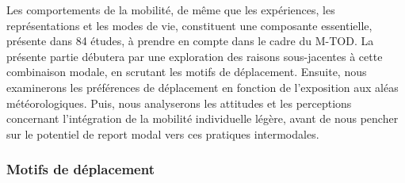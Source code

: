 \begin{refsegment}
Les comportements de la mobilité, de même que les expériences, les représentations et les modes de vie, constituent une composante essentielle, présente dans 84 études, à prendre en compte dans le cadre du \acrshort{M-TOD}. La présente partie débutera par une exploration des raisons sous-jacentes à cette combinaison modale, en scrutant les motifs de déplacement. Ensuite, nous examinerons les préférences de déplacement en fonction de l'exposition aux aléas météorologiques. Puis, nous analyserons les attitudes et les perceptions concernant l'intégration de la mobilité individuelle légère, avant de nous pencher sur le potentiel de report modal vers ces pratiques intermodales.%

\subsubsection*{Motifs de déplacement
    \label{chap2:motifs-deplacement}
    }
    

\end{refsegment}

